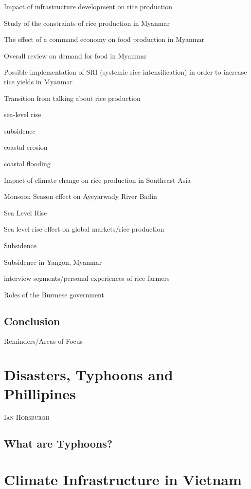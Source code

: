 \documentclass{book}\usepackage{knitr}
\makeatletter
\newcommand{\chapterauthor}[1]{%
  {\parindent0pt\vspace*{-25pt}%
  \linespread{1.1}\large\scshape#1%
  \par\nobreak\vspace*{35pt}}
  \@afterheading%
}
\makeatother
\begin{document}
\begin{knitrout}
\begin{kframe}
Impact of infrastructure development on rice production

Study of the constraints of rice production in Myanmar

The effect of a command economy on food production in Myanmar 

Overall review on demand for food in Myanmar 

Possible implementation of SRI (systemic rice intensification) in order to increase rice yields in Myanmar

Transition from talking about rice production

sea-level rise

subsidence

coastal erosion

coastal flooding

Impact of climate change on rice production in Southeast Asia

Monsoon Season effect on Ayeyarwady River Badin

Sea Level Rise 

Sea level rise effect on global markets/rice production


Subsidence

Subsidence in Yangon, Myanmar

interview segments/personal experiences of rice farmers


Roles of the Burmese government

\section{Conclusion}

Reminders/Areas of Focus




\chapter{Disasters, Typhoons and Phillipines}

\chapterauthor{Ian Horsburgh}

\section{What are Typhoons?}



\chapter{Climate Infrastructure in Vietnam}


\end{kframe}
\end{knitrout}
\end{document}
